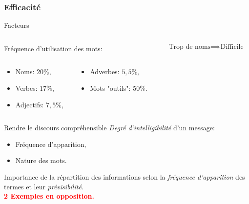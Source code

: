 \begin{frame}
	\frametitle{Efficacité}
	\begin{exampleblock}{Facteurs}
		\begin{columns}
			\begin{column}{.6\textwidth}
				Fréquence d'utilisation des mots:
				\vspace{-0.2cm}
				\begin{columns}
				\small
				\begin{column}{0.45\textwidth}
				\begin{itemize}
					\item Noms: $20\%$,
					\item Verbes: $17\%$,
					\item Adjectifs: $7{,}5\%$,
				\end{itemize}
				\end{column}
				\begin{column}{0.55\textwidth}
				\begin{itemize}
					\item Adverbes: $5{,}5\%$,
					\item Mots "outils": $50\%$.
				\end{itemize}
				\end{column}
				\end{columns}
			\end{column}
			\begin{column}{.4\textwidth}
				\[ \text{Trop de noms} \implies \text{Difficile} \]
			\end{column}
		\end{columns}
	\end{exampleblock}
	\begin{block}{Rendre le discours compréhensible}
		\emph{Degré d'intelligibilité} d'un message:
		\begin{itemize}
			\item Fréquence d'apparition,
			\item Nature des mots.
		\end{itemize}
		Importance de la répartition des informations selon la \emph{fréquence d'apparition} des termes et leur \emph{prévisibilité}.\\
		\bfseries \textcolor{red}{2 Exemples en opposition.}
	\end{block}
\end{frame}
